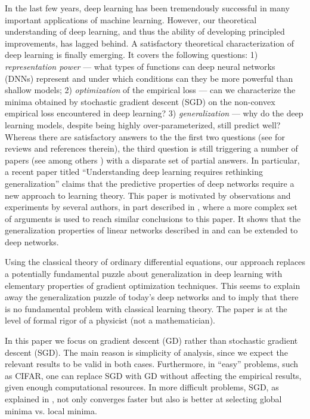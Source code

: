 \documentclass[10pt]{article}
\begin{document}
In the last few years, deep learning has been tremendously successful
in many important applications of machine learning. However, our
theoretical understanding of deep learning, and thus the ability of
developing principled improvements, has lagged behind. A satisfactory
theoretical characterization of deep learning is finally emerging. It
covers the following questions: 1) {\it representation power} --- what
types of functions can deep neural networks (DNNs) represent and under
which conditions can they be more powerful than shallow models; 2)
{\it optimization} of the empirical loss --- can we characterize the
minima obtained by stochastic gradient descent (SGD) on the non-convex
empirical loss encountered in deep learning? 3) {\it generalization}
--- why do the deep learning models, despite being highly
over-parameterized, still predict well? Whereas there are satisfactory
answers to the the first two questions (see for reviews
\cite{Theory_I,Theory_II} and references therein), the third question
is still triggering a number of papers (see among others
\cite{Hardt2016, NeyshaburSrebro2017, Sapiro2017, 2017arXiv170608498B,
  Musings2017}) with a disparate set of partial answers.  In
particular, a recent paper titled ``Understanding deep learning
requires rethinking
generalization''\cite{DBLP:journals/corr/ZhangBHRV16} claims that the
predictive properties of deep networks require a new approach to
learning theory. This paper is motivated by observations and
experiments by several authors, in part described in
\cite{Musings2017}, where a more complex set of arguments is used to
reach similar conclusions to this paper. It shows that the
generalization properties of linear networks described in
\cite{2017arXiv171010345S} and \cite{RosascoRecht2017} can be extended to deep
networks.

Using the classical theory of  ordinary differential equations, our approach replaces a
potentially fundamental puzzle about generalization in deep learning
with elementary properties of gradient optimization techniques. This
seems to explain away the generalization puzzle of today's deep
networks and to imply that there is no fundamental problem with classical
learning theory. The paper is at the level of formal rigor of a
physicist (not a mathematician).

In this paper we focus on gradient descent (GD) rather than stochastic
gradient descent (SGD). The main reason is simplicity of analysis,
since we expect the relevant results to be valid in both
cases. Furthermore, in ``easy'' problems, such as CIFAR, one can
replace SGD with GD without affecting the empirical results, given
enough computational resources. In more difficult problems, SGD, as
explained in \cite{Theory_IIb}, not only converges faster but also is
better at selecting global minima vs. local minima. 
\end{document}
